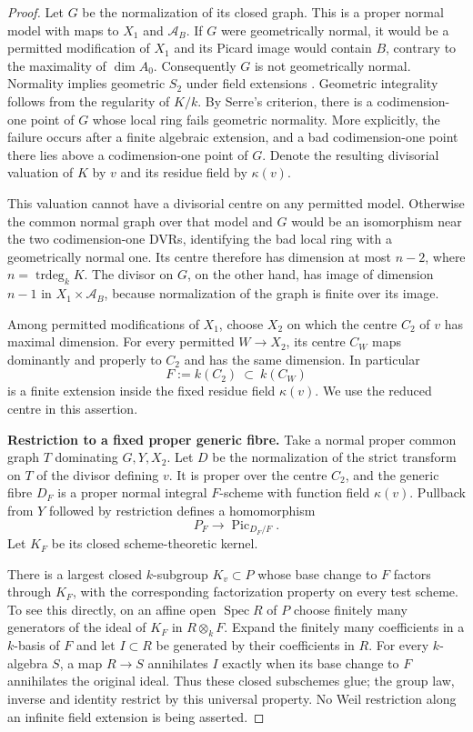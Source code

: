 \begin{proof}
Let $G$ be the normalization of its closed graph.  This is a
proper normal model with maps to $X_1$ and $\mathcal A_B$.
If $G$ were geometrically normal, it would be a permitted
modification of $X_1$ and its Picard image would contain $B$,
contrary to the maximality of $\dim A_0$.
Consequently $G$ is not geometrically normal.
Normality implies geometric $S_2$ under field extensions
\cite[Tags 045M and 0339]{StacksB}.  Geometric integrality
follows from the regularity of $K/k$.  By Serre's criterion,
there is a codimension-one point of $G$ whose local ring fails
geometric normality.  More explicitly, the failure occurs after
a finite algebraic extension, and a bad codimension-one point
there lies above a codimension-one point of $G$.
Denote the resulting divisorial valuation of $K$ by $v$ and its
residue field by $\kappa(v)$.

This valuation cannot have a divisorial centre on any permitted
model.  Otherwise the common normal graph over that model and
$G$ would be an isomorphism near the two codimension-one DVRs,
identifying the bad local ring with a geometrically normal one.
Its centre therefore has dimension at most $n-2$, where
$n=\operatorname{trdeg}_k K$.
The divisor on $G$, on the other hand, has image of dimension
$n-1$ in $X_1\times\mathcal A_B$, because normalization of
the graph is finite over its image.

Among permitted modifications of $X_1$, choose $X_2$ on which
the centre $C_2$ of $v$ has maximal dimension.  For every
permitted $W\to X_2$, its centre $C_W$ maps dominantly and
properly to $C_2$ and has the same dimension.  In particular
\[
                 F:=k(C_2)\ \subset\ k(C_W)
\]
is a finite extension inside the fixed residue field $\kappa(v)$.
We use the reduced centre in this assertion.

\par\smallskip\noindent\textbf{Restriction to a fixed proper generic fibre.}\quad
Take a normal proper common graph $T$ dominating $G,Y,X_2$.
Let $D$ be the normalization of the strict transform on $T$
of the divisor defining $v$.  It is proper over the centre
$C_2$, and the generic fibre $D_F$ is a proper normal integral
$F$-scheme with function field $\kappa(v)$.
Pullback from $Y$ followed by restriction defines a homomorphism
\[
                P_F\longrightarrow\operatorname{Pic}_{D_F/F}.
\]
Let $K_F$ be its closed scheme-theoretic kernel.

There is a largest closed $k$-subgroup $K_v\subset P$ whose
base change to $F$ factors through $K_F$, with the corresponding
factorization property on every test scheme.
To see this directly, on an affine open $\operatorname{Spec}R$
of $P$ choose finitely many generators of the ideal of $K_F$
in $R\otimes_k F$.  Expand the finitely many coefficients in
a $k$-basis of $F$ and let $I\subset R$ be generated by their
coefficients in $R$.  For every $k$-algebra $S$, a map $R\to S$
annihilates $I$ exactly when its base change to $F$ annihilates
the original ideal.  Thus these closed subschemes glue; the
group law, inverse and identity restrict by this universal
property.  No Weil restriction along an infinite field
extension is being asserted.


\end{proof}

